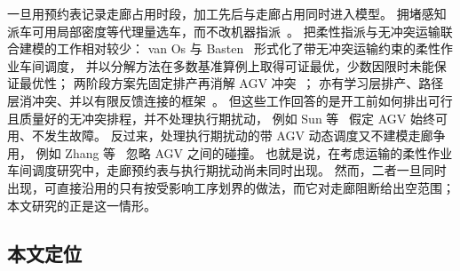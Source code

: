 \documentclass[manuscript,screen,review]{acmart}
\begin{document}
一旦用预约表记录走廊占用时段，加工先后与走廊占用同时进入模型。
拥堵感知派车可用局部密度等代理量选车，而不改机器指派~\cite{kim2026congestion}。
把柔性指派与无冲突运输联合建模的工作相对较少：
van Os 与 Basten~\cite{vanos2026exact} 形式化了带无冲突运输约束的柔性作业车间调度，
并以分解方法在多数基准算例上取得可证最优，少数因限时未能保证最优性；
两阶段方案先固定排产再消解 AGV 冲突~\cite{sun2023integrated}；
亦有学习层排产、路径层消冲突、并以有限反馈连接的框架~\cite{li2026framework}。
但这些工作回答的是开工前如何排出可行且质量好的无冲突排程，并不处理执行期扰动，
例如 Sun 等~\cite{sun2023integrated} 假定 AGV 始终可用、不发生故障。
反过来，处理执行期扰动的带 AGV 动态调度又不建模走廊争用，
例如 Zhang 等~\cite{zhang2023energy} 忽略 AGV 之间的碰撞。
也就是说，在考虑运输的柔性作业车间调度研究中，走廊预约表与执行期扰动尚未同时出现。
然而，二者一旦同时出现，可直接沿用的只有按受影响工序划界的做法，而它对走廊阻断给出空范围；
本文研究的正是这一情形。

\subsection{本文定位}
\label{sec:rw_claim}
\end{document}
